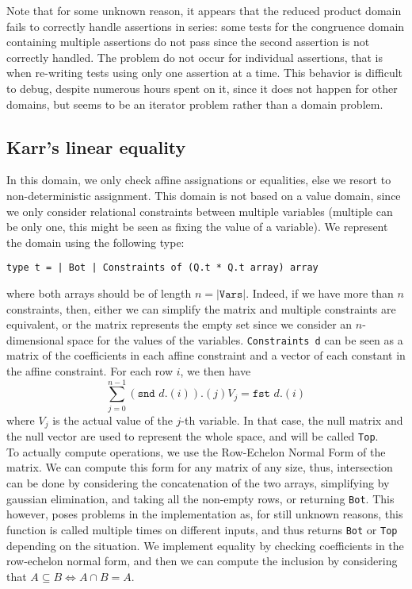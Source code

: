 \documentclass[12pt,a4paper]{article}
\begin{document}
Note that for some unknown reason, it appears that the reduced product domain fails to correctly handle assertions in series: some tests for the congruence domain containing multiple assertions do not pass since the second assertion is not correctly handled. The problem do not occur for individual assertions, that is when re-writing tests using only one assertion at a time. This behavior is difficult to debug, despite numerous hours spent on it, since it does not happen for other domains, but seems to be an iterator problem rather than a domain problem.

\subsection{Karr's linear equality}
\label{sec:karr}
In this domain, we only check affine assignations or equalities, else we resort to non-deterministic assignment. This domain is not based on a value domain, since we only consider relational constraints between multiple variables (multiple can be only one, this might be seen as fixing the value of a variable).
We represent the domain using the following type:
\begin{center}
	\texttt{type t = | Bot | Constraints of (Q.t * Q.t array) array}
\end{center}
where both arrays should be of length $n = |\texttt{Vars}|$.
Indeed, if we have more than $n$ constraints, then, either we can simplify the matrix and multiple constraints are equivalent, or the matrix represents the empty set since we consider an $n$-dimensional space for the values of the variables.
\texttt{Constraints d} can be seen as a matrix of the coefficients in each affine constraint and a vector of each constant in the affine constraint. For each row $i$, we then have
\begin{equation*}
    \sum_{j = 0}^{n - 1} (\texttt{snd } d.(i)).(j) V_{j} = \texttt{fst } d.(i)
\end{equation*}
where $V_{j}$ is the actual value of the $j$-th variable.
In that case, the null matrix and the null vector are used to represent the whole space, and will be called \texttt{Top}.\\
To actually compute operations, we use the Row-Echelon Normal Form of the matrix.
We can compute this form for any matrix of any size, thus, intersection can be done by considering the concatenation of the two arrays, simplifying by gaussian elimination, and taking all the non-empty rows, or returning \texttt{Bot}.
This however, poses problems in the implementation as, for still unknown reasons, this function is called multiple times on different inputs, and thus returns \texttt{Bot} or \texttt{Top} depending on the situation.
We implement equality by checking coefficients in the row-echelon normal form, and then we can compute the inclusion by considering that $A \subseteq B \Leftrightarrow A \cap B = A$.
\end{document}
